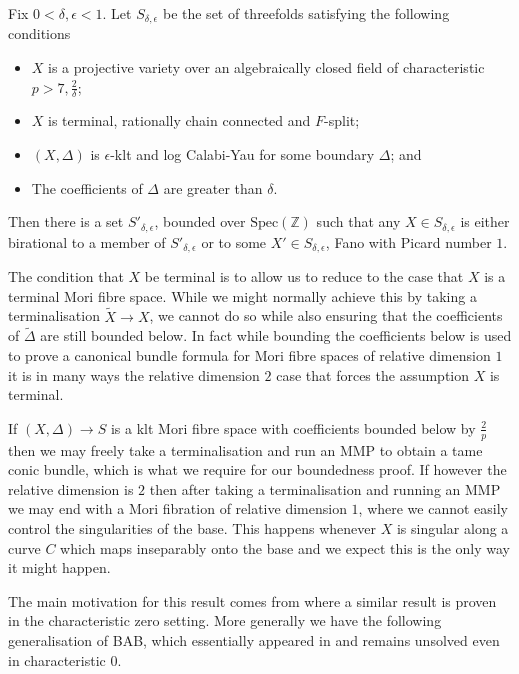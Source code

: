 \documentclass[a4paper,12pt]{book}
\newcommand{\D}{\Delta}
\begin{document}
\begin{theorem}\label{Main}
	Fix $0 < \delta, \epsilon <1$. Let $S_{\delta,\epsilon}$ be the set of threefolds satisfying the following conditions
	\begin{itemize}
		\item $X$ is a projective variety over an algebraically closed field of characteristic $p >7, \frac{2}{\delta}$;
		\item $X$ is terminal, rationally chain connected and $F$-split;
		\item $(X,\Delta)$ is $\epsilon$-klt and log Calabi-Yau for some boundary $\Delta$; and
		\item The coefficients of $\Delta$ are greater than $\delta$.
	\end{itemize}
	
	Then there is a set $S'_{\delta,\epsilon}$, bounded over $\text{Spec}(\mathbb{Z})$ such that any $X\in S_{\delta,\epsilon}$ is either birational to a member of $S'_{\delta,\epsilon}$ or to some $X'\in S_{\delta,\epsilon}$, Fano with Picard number $1$. 
\end{theorem}
\begin{remark}
	The condition that $X$ be terminal is to allow us to reduce to the case that $X$ is a terminal Mori fibre space. While we might normally achieve this by taking a terminalisation $\tilde{X} \to X$, we cannot do so while also ensuring that the coefficients of $\tilde{\D}$ are still bounded below. In fact while bounding the coefficients below is used to prove a canonical bundle formula for Mori fibre spaces of relative dimension $1$ it is in many ways the relative dimension $2$ case that forces the assumption $X$ is terminal.
	
	If $(X,\Delta) \to S$ is a klt Mori fibre space with coefficients bounded below by $\frac{2}{p}$ then we may freely take a terminalisation and run an MMP to obtain a tame conic bundle, which is what we require for our boundedness proof. If however the relative dimension is $2$ then after taking a terminalisation and running an MMP we may end with a Mori fibration of relative dimension $1$, where we cannot easily control the singularities of the base. This happens whenever $X$ is singular along a curve $C$ which maps inseparably onto the base and we expect this is the only way it might happen. 
\end{remark}

The main motivation for this result comes from \cite{chen2018birational} where a similar result is proven in the characteristic zero setting. More generally we have the following generalisation of BAB, which essentially appeared in \cite{mckernan2003threefold} and remains unsolved even in characteristic $0$. 
\end{document}
